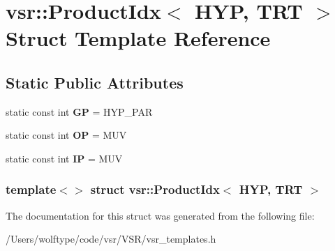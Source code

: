\hypertarget{structvsr_1_1_product_idx_3_01_h_y_p_00_01_t_r_t_01_4}{\section{vsr\-:\-:Product\-Idx$<$ H\-Y\-P, T\-R\-T $>$ Struct Template Reference}
\label{structvsr_1_1_product_idx_3_01_h_y_p_00_01_t_r_t_01_4}
}
\subsection*{Static Public Attributes}
\begin{DoxyCompactItemize}
\item 
\hypertarget{structvsr_1_1_product_idx_3_01_h_y_p_00_01_t_r_t_01_4_a86d0f3ba114ed88e5f098a2af1fab6bd}{static const int {\bfseries G\-P} = H\-Y\-P\-\_\-\-P\-A\-R}\label{structvsr_1_1_product_idx_3_01_h_y_p_00_01_t_r_t_01_4_a86d0f3ba114ed88e5f098a2af1fab6bd}

\item 
\hypertarget{structvsr_1_1_product_idx_3_01_h_y_p_00_01_t_r_t_01_4_a88dc02cdf773d35016f61f4e0b7abc02}{static const int {\bfseries O\-P} = M\-U\-V}\label{structvsr_1_1_product_idx_3_01_h_y_p_00_01_t_r_t_01_4_a88dc02cdf773d35016f61f4e0b7abc02}

\item 
\hypertarget{structvsr_1_1_product_idx_3_01_h_y_p_00_01_t_r_t_01_4_adfe30b1139528c05fd9f01519679c81a}{static const int {\bfseries I\-P} = M\-U\-V}\label{structvsr_1_1_product_idx_3_01_h_y_p_00_01_t_r_t_01_4_adfe30b1139528c05fd9f01519679c81a}

\end{DoxyCompactItemize}
\subsubsection*{template$<$$>$ struct vsr\-::\-Product\-Idx$<$ H\-Y\-P, T\-R\-T $>$}



The documentation for this struct was generated from the following file\-:\begin{DoxyCompactItemize}
\item 
/\-Users/wolftype/code/vsr/\-V\-S\-R/vsr\-\_\-templates.\-h\end{DoxyCompactItemize}
